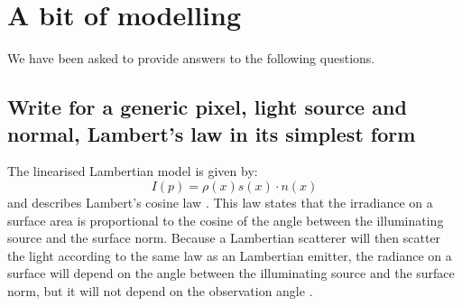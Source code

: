 \section{A bit of modelling}
We have been asked to provide answers to the following questions.

\subsection{Write for a generic pixel, light source and normal, Lambert’s law in its simplest form}
The linearised Lambertian model is given by:
\begin{equation}
	I(p) = \rho(x)s(x) \cdot n(x)
	\label{Laberts_law}
\end{equation}
and describes Lambert's cosine law \cite{slides}. This law states that the irradiance on a surface area is proportional to the cosine of the angle between the illuminating source and the surface norm. Because a Lambertian scatterer will then scatter the light according to the same law as an Lambertian emitter, the radiance on a surface will depend on the angle between the illuminating source and the surface norm, but it will not depend on the observation angle \cite{lamberts_law_wiki}.\\
